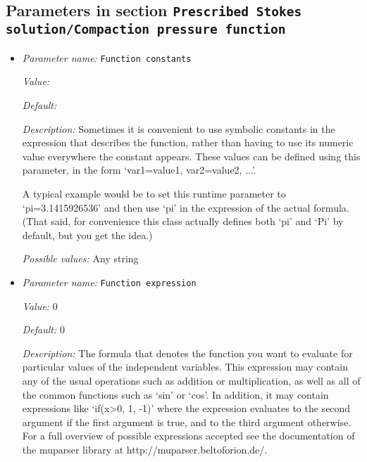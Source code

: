 \subsection{Parameters in section \tt Prescribed Stokes solution/Compaction pressure function}
\label{parameters:Prescribed_20Stokes_20solution/Compaction_20pressure_20function}

\begin{itemize}
\item {\it Parameter name:} {\tt Function constants}
\label{parameters:Prescribed Stokes solution/Compaction pressure function/Function constants}


{\it Value:} 


{\it Default:} 


{\it Description:} Sometimes it is convenient to use symbolic constants in the expression that describes the function, rather than having to use its numeric value everywhere the constant appears. These values can be defined using this parameter, in the form `var1=value1, var2=value2, ...'.

A typical example would be to set this runtime parameter to `pi=3.1415926536' and then use `pi' in the expression of the actual formula. (That said, for convenience this class actually defines both `pi' and `Pi' by default, but you get the idea.)


{\it Possible values:} Any string
\item {\it Parameter name:} {\tt Function expression}
\label{parameters:Prescribed Stokes solution/Compaction pressure function/Function expression}


{\it Value:} 0


{\it Default:} 0


{\it Description:} The formula that denotes the function you want to evaluate for particular values of the independent variables. This expression may contain any of the usual operations such as addition or multiplication, as well as all of the common functions such as `sin' or `cos'. In addition, it may contain expressions like `if(x>0, 1, -1)' where the expression evaluates to the second argument if the first argument is true, and to the third argument otherwise. For a full overview of possible expressions accepted see the documentation of the muparser library at http://muparser.beltoforion.de/.


\end{itemize}
